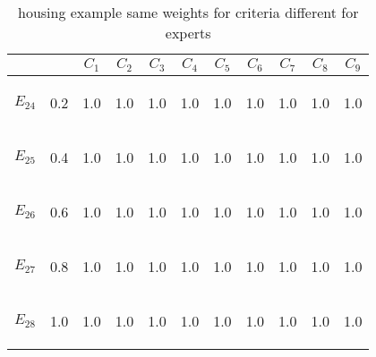 \begin{table}[htp]
\begin{center}
\begin{tabular}{|cc|c|c|c|c|c|c|c|c|c|}
\hline \hline
& & $C_1$ & $C_2$ & $C_3$ & $C_4$ & $C_5$ & $C_6$ & $C_7$ & $C_8$ & $C_9$\\
\hline \hline
\begin{scriptsize}$E_{24}$\end{scriptsize} & \begin{scriptsize}0.2\end{scriptsize} & 1.0 & 1.0 & 1.0 & 1.0 & 1.0 & 1.0 & 1.0 & 1.0 & 1.0\\
\begin{scriptsize}$E_{25}$\end{scriptsize} & \begin{scriptsize}0.4\end{scriptsize} & 1.0 & 1.0 & 1.0 & 1.0 & 1.0 & 1.0 & 1.0 & 1.0 & 1.0\\
\begin{scriptsize}$E_{26}$\end{scriptsize} & \begin{scriptsize}0.6\end{scriptsize} & 1.0 & 1.0 & 1.0 & 1.0 & 1.0 & 1.0 & 1.0 & 1.0 & 1.0\\
\begin{scriptsize}$E_{27}$\end{scriptsize} & \begin{scriptsize}0.8\end{scriptsize} & 1.0 & 1.0 & 1.0 & 1.0 & 1.0 & 1.0 & 1.0 & 1.0 & 1.0\\
\begin{scriptsize}$E_{28}$\end{scriptsize} & \begin{scriptsize}1.0\end{scriptsize} & 1.0 & 1.0 & 1.0 & 1.0 & 1.0 & 1.0 & 1.0 & 1.0 & 1.0\\
\hline \hline
\end{tabular}
\end{center}
\caption{housing example same weights for criteria different for experts}
\label{criteriaSame}
\end{table}